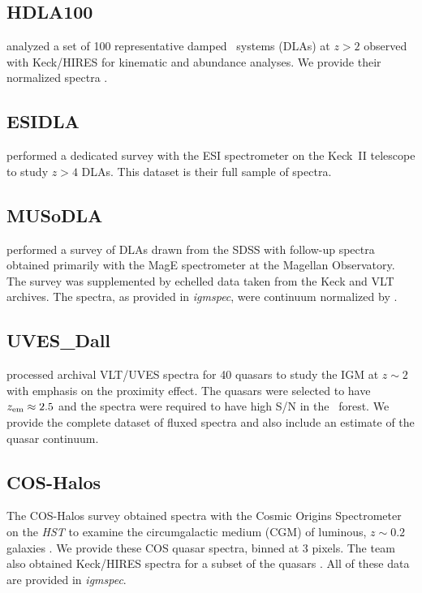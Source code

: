 \documentclass[12pt]{elsarticle}
\begin{document}
\subsection{HDLA100}
\label{sec:hdla100}

\cite{marcel13} analyzed a set of 100 representative
damped \lya\ systems
(DLAs) at $z>2$
observed with Keck/HIRES for kinematic and abundance
analyses.  We provide their normalized spectra
\citep[see also][]{pwh+07}.

\subsection{ESIDLA}
\label{sec:esidla}

\cite{rafelski+12,rafelski+14} performed a dedicated survey
with the ESI spectrometer \citep{sbe+02} on the Keck~II telescope
to study $z>4$ DLAs.  This dataset is their
full sample of spectra.

\subsection{MUSoDLA}
\label{sec:musodla}

\cite{jorgenson+13} performed a survey of DLAs drawn from the
SDSS with follow-up spectra obtained primarily with the 
MagE spectrometer at the Magellan Observatory.  The survey was 
supplemented by echelled data taken from the Keck and VLT
archives.  The spectra, as provided in {\it igmspec}, were continuum
normalized by \cite{jorgenson+13}.

\subsection{UVES\_Dall}
\label{sec:uvesdall}

\cite{dww08} processed archival VLT/UVES spectra for 40 quasars 
to study the IGM at $z \sim 2$ with emphasis on the proximity effect.
The quasars were selected to have $z_{\rm em} \approx 2.5$ and the
spectra were required to have high S/N in the \lya\ forest.
We provide the complete dataset of fluxed spectra and also include
an estimate of the quasar continuum.

\subsection{COS-Halos}
\label{sec:cos-halos}

The COS-Halos survey obtained spectra with the
Cosmic Origins Spectrometer 
\citep[COS;][]{cos} on the {\it HST}
to examine the circumgalactic medium (CGM) of luminous,
$z \sim 0.2$ galaxies \citep{tumlinson+13}.
We provide these COS quasar spectra, binned at 3 pixels.
The team also obtained Keck/HIRES spectra for a subset of the
quasars \citep{werk+13}.
All of these data are provided in {\it igmspec}.
\end{document}
